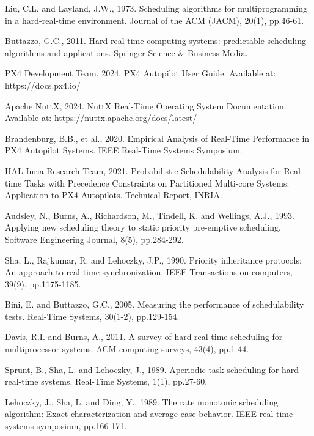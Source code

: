 \documentclass[12pt,a4paper]{article}
\begin{document}
\begin{thebibliography}{20}
Liu, C.L. and Layland, J.W., 1973. Scheduling algorithms for multiprogramming in a hard-real-time environment. Journal of the ACM (JACM), 20(1), pp.46-61.

Buttazzo, G.C., 2011. Hard real-time computing systems: predictable scheduling algorithms and applications. Springer Science \& Business Media.

PX4 Development Team, 2024. PX4 Autopilot User Guide. Available at: https://docs.px4.io/

Apache NuttX, 2024. NuttX Real-Time Operating System Documentation. Available at: https://nuttx.apache.org/docs/latest/

Brandenburg, B.B., et al., 2020. Empirical Analysis of Real-Time Performance in PX4 Autopilot Systems. IEEE Real-Time Systems Symposium.

HAL-Inria Research Team, 2021. Probabilistic Schedulability Analysis for Real-time Tasks with Precedence Constraints on Partitioned Multi-core Systems: Application to PX4 Autopilots. Technical Report, INRIA.

Audsley, N., Burns, A., Richardson, M., Tindell, K. and Wellings, A.J., 1993. Applying new scheduling theory to static priority pre-emptive scheduling. Software Engineering Journal, 8(5), pp.284-292.

Sha, L., Rajkumar, R. and Lehoczky, J.P., 1990. Priority inheritance protocols: An approach to real-time synchronization. IEEE Transactions on computers, 39(9), pp.1175-1185.

Bini, E. and Buttazzo, G.C., 2005. Measuring the performance of schedulability tests. Real-Time Systems, 30(1-2), pp.129-154.

Davis, R.I. and Burns, A., 2011. A survey of hard real-time scheduling for multiprocessor systems. ACM computing surveys, 43(4), pp.1-44.

Sprunt, B., Sha, L. and Lehoczky, J., 1989. Aperiodic task scheduling for hard-real-time systems. Real-Time Systems, 1(1), pp.27-60.

Lehoczky, J., Sha, L. and Ding, Y., 1989. The rate monotonic scheduling algorithm: Exact characterization and average case behavior. IEEE real-time systems symposium, pp.166-171.


\end{thebibliography}
\end{document}
